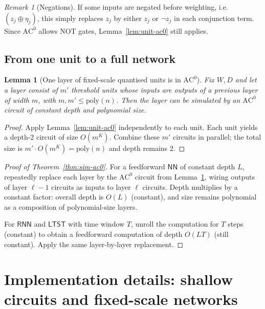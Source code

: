 \documentclass[11pt]{article}
\newcommand{\AC}{\mathrm{AC}}
\newcommand{\poly}{\mathrm{poly}}
\newcommand{\NN}{\mathsf{NN}}
\newcommand{\RNN}{\mathsf{RNN}}
\newcommand{\LTST}{\mathsf{LTST}}
\theoremstyle{plain}
\newtheorem{lemma}[theorem]{Lemma}
\theoremstyle{definition}
\theoremstyle{remark}
\newtheorem{remark}[theorem]{Remark}
\numberwithin{equation}{section}
\begin{document}
\begin{remark}[Negations]
If some inputs are negated before weighting, i.e.\ $(z_j\oplus \eta_j)$, this simply replaces $z_j$ by either $z_j$ or $\neg z_j$ in each conjunction term.
Since $\AC^0$ allows NOT gates, Lemma~\ref{lem:unit-ac0} still applies.
\end{remark}

\subsection{From one unit to a full network}
\label{app:network}

\begin{lemma}[One layer of fixed-scale quantised units is in $\AC^0$]
\label{lem:layer-ac0}
Fix $W,D$ and let a layer consist of $m'$ threshold units whose inputs are outputs of a previous layer of width $m$, with $m,m'\le \poly(n)$.
Then the layer can be simulated by an $\AC^0$ circuit of constant depth and polynomial size.
\end{lemma}

\begin{proof}
Apply Lemma~\ref{lem:unit-ac0} independently to each unit. Each unit yields a depth-2 circuit of size $O(m^K)$.
Combine these $m'$ circuits in parallel; the total size is $m'\cdot O(m^K)=\poly(n)$ and depth remains $2$.
\end{proof}

\begin{proof}[Proof of Theorem~\ref{thm:sim-ac0}]
For a feedforward $\NN$ of constant depth $L$, repeatedly replace each layer by the $\AC^0$ circuit from Lemma~\ref{lem:layer-ac0}, wiring outputs of layer $\ell-1$ circuits as inputs to layer $\ell$ circuits.
Depth multiplies by a constant factor: overall depth is $O(L)$ (constant), and size remains polynomial as a composition of polynomial-size layers.

For $\RNN$ and $\LTST$ with time window $T$, unroll the computation for $T$ steps (constant) to obtain a feedforward computation of depth $O(LT)$ (still constant). Apply the same layer-by-layer replacement.
\end{proof}

\section{Implementation details: shallow circuits and fixed-scale networks}
\label{app:impl}
\end{document}

